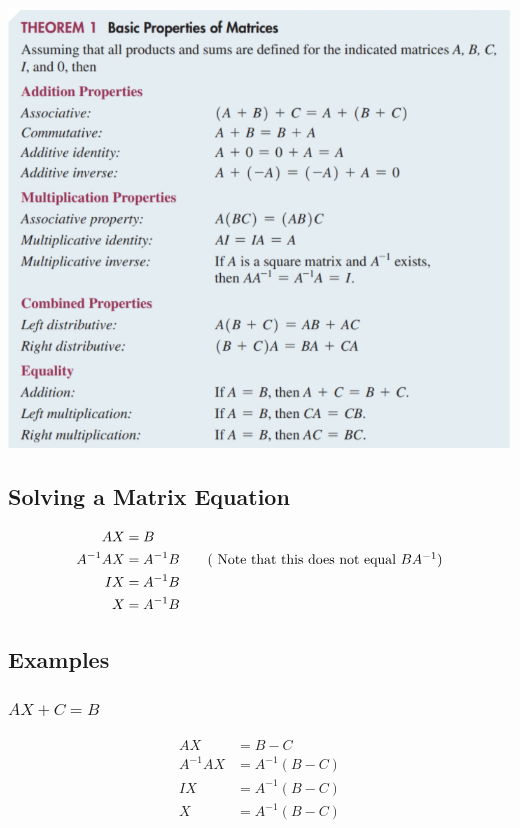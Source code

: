 \documentclass[14pt]{extarticle}
\begin{document}
\includegraphics[width=1.0\linewidth]{4-6-1}

\subsection{Solving a Matrix Equation}
\begin{align*}
	AX&=B \\
	A^{-1}AX &=A^{-1}B \tag{ Note that this does not equal $BA^{-1}$} \\
	IX &= A^{-1}B \\
	X &= A^{-1}B
\end{align*}

\subsection{Examples}
\subsubsection{$AX+C=B$}
\begin{align*}
	AX &= B-C \\
	A^{-1}AX &= A^{-1}(B-C)\\
	IX &= A^{-1}(B-C) \\
	X &= A^{-1}(B-C)
\end{align*}
\end{document}
